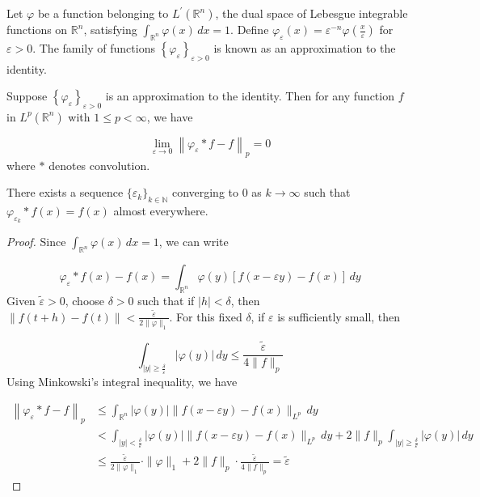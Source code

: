 \begin{definition}
    Let $\varphi$ be a function belonging to $L^{\prime}\left(\mathbb{R}^n\right)$, the dual space of Lebesgue integrable functions on $\mathbb{R}^n$, satisfying $\int_{\mathbb{R}^n} \varphi(x) \, dx = 1$. Define $\varphi_{\varepsilon}(x) = \varepsilon^{-n} \varphi\left(\frac{x}{\varepsilon}\right)$ for $\varepsilon > 0$. The family of functions $\left\{\varphi_{\varepsilon}\right\}_{\varepsilon > 0}$ is known as an approximation to the identity.
\end{definition}
\begin{theorem}
    Suppose $\left\{\varphi_{\varepsilon}\right\}_{\varepsilon > 0}$ is an approximation to the identity. Then for any function $f$ in $L^p(\mathbb{R}^n)$ with $1 \leq p < \infty$, we have

$$\lim_{\varepsilon \to 0} \left\|\varphi_{\varepsilon} * f - f\right\|_p = 0$$where $*$ denotes convolution.
\end{theorem}
\begin{rmk}
    There exists a sequence $\{\varepsilon_k\}_{k \in \mathbb{N}}$ converging to 0 as $k \to \infty$ such that $\varphi_{\varepsilon_k} * f(x) = f(x)$ almost everywhere.
\end{rmk}
\begin{proof}
    Since $\int_{\mathbb{R}^n} \varphi(x) \, dx = 1$, we can write

$$\varphi_{\varepsilon} * f(x) - f(x) = \int_{\mathbb{R}^n} \varphi(y) [f(x - \varepsilon y) - f(x)] \, dy$$Given $\tilde{\varepsilon} > 0$, choose $\delta > 0$ such that if $|h| < \delta$, then $\|f(t + h) - f(t)\| < \frac{\tilde{\varepsilon}}{2\|\varphi\|_1}$. For this fixed $\delta$, if $\varepsilon$ is sufficiently small, then

$$\int_{|y| \geq \frac{\delta}{\varepsilon}} |\varphi(y)| \, dy \leq \frac{\tilde{\varepsilon}}{4\|f\|_p}$$Using Minkowski's integral inequality, we have

$$\begin{aligned}
\left\|\varphi_{\varepsilon} * f - f\right\|_p &\leq \int_{\mathbb{R}^n} |\varphi(y)| \|f(x - \varepsilon y) - f(x)\|_{L^p} \, dy \\
&< \int_{|y| < \frac{\delta}{\varepsilon}} |\varphi(y)| \|f(x - \varepsilon y) - f(x)\|_{L^p} \, dy + 2\|f\|_p \int_{|y| \geq \frac{\delta}{\varepsilon}} |\varphi(y)| \, dy \\
&\leq \frac{\tilde{\varepsilon}}{2\|\varphi\|_1} \cdot \|\varphi\|_1 + 2\|f\|_p \cdot \frac{\tilde{\varepsilon}}{4\|f\|_p} = \tilde{\varepsilon}
\end{aligned}$$
\end{proof}
